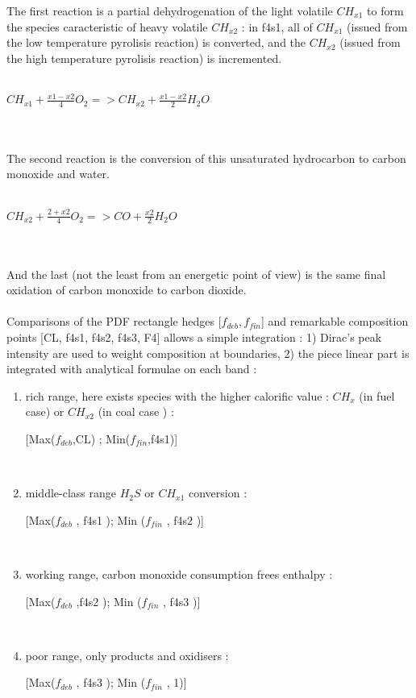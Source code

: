 The first reaction is a partial dehydrogenation of the light volatile
$CH_{x1}$ to form the species caracteristic of heavy volatile
$CH_{x2}$ : in f4s1, all of $CH_{x1}$ ({\small issued from the low
temperature pyrolisis reaction}) is converted, and the $CH_{x2}$
({\small issued from the high temperature pyrolisis reaction}) is
incremented.\\
\\
\centerline{$CH_{x1} + \frac{x1-x2}{4} O_{2} => CH_{x2} + \frac{x1-x2}{2} H_{2}O $}\\
\\
The second reaction is the conversion of this unsaturated hydrocarbon
to carbon monoxide and water.\\
\\
\centerline{$CH_{x2} + \frac{2+x2}{4} O_{2} => CO + \frac{x2}{2} H_{2}O $}\\
\\
And the last ({\small not the least from an energetic point of view})
is the same final oxidation of carbon monoxide to carbon dioxide.\\
\\
Comparisons of the PDF rectangle hedges [$f_{deb} , f_{fin}$] and
remarkable composition points [CL, f4s1, f4s2, f4s3, F4] allows a
simple integration : 1) Dirac's peak intensity are used to weight
composition at boundaries, 2) the piece linear part is integrated with
analytical formulae on each band :\\
\begin{enumerate}
\item rich range, here exists species with the higher calorific value : $CH_{x}$ ({\small in fuel case}) or $CH_{x2}$ ({\small in coal case }) :\\  \centerline{[Max($f_{deb}$,CL) ; Min($f_{fin}$,f4s1)]}\\
\item middle-class range $H_{2}S$ or $CH_{x1}$ conversion :\\
 \centerline{[Max($f_{deb}$ , f4s1 ); Min ($f_{fin}$ , f4s2 )]}\\
\item working range, carbon monoxide consumption frees enthalpy :\\ \centerline{ [Max($f_{deb}$ ,f4s2 ); Min ($f_{fin}$ , f4s3 )]}\\
\item poor range, only products and oxidisers :\\ \centerline{ [Max($f_{deb}$ , f4s3 ); Min ($f_{fin}$ , 1)]}\\
\end{enumerate}


